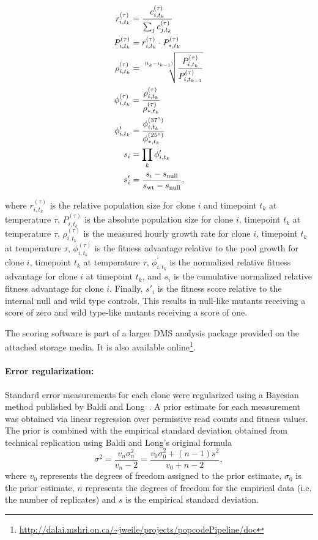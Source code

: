 \begin{align*}
r_{i,t_k}^{(\tau)} &= \frac{ c_{i,t_k}^{(\tau)} }{ \sum_j c_{j,t_k}^{(\tau)} }\\
P_{i,t_k}^{(\tau)} &= r_{i,t_k}^{(\tau)} \cdot P_{*,t_k}^{(\tau)} \\
\rho_{i,t_k}^{(\tau)} &= \sqrt[\uproot{5}(t_k - t_{k-1})]{\frac{P_{i,t_k}^{(\tau)}}{P_{i,t_{k-1}}^{(\tau)}}} \\
\phi_{i,t_k}^{(\tau)} &= \frac{\rho_{i,t_k}^{(\tau)}}{\rho_{*,t_k}^{(\tau)}}\\
\phi_{i,t_k}^\prime &= \frac{\phi_{i,t_k}^{(37^{\circ})}}{\phi_{*,t_k}^{(25^{\circ})}}\\
s_i &= \prod_k \phi_{i,t_k}^\prime \\
s'_i &= \frac{s_i - s_\text{null}}{s_\text{wt} - s_\text{null}},
\end{align*}

where $r_{i,t_k}^{(\tau)}$ is the relative population size for clone $i$ and timepoint $t_k$ at temperature $\tau$, $P_{i,t_k}^{(\tau)}$ is the absolute population size for clone $i$, timepoint $t_k$ at temperature $\tau$, $\rho_{i,t_k}^{(\tau)}$ is the measured hourly growth rate for clone $i$, timepoint $t_k$ at temperature $\tau$, $\phi_{i,t_k}^{(\tau)}$ is the fitness advantage relative to the pool growth for clone $i$, timepoint $t_k$ at temperature $\tau$, $\phi_{i,t_k}^\prime$ is the normalized relative fitness advantage for clone $i$ at timepoint $t_k$, and $s_i$ is the cumulative normalized relative fitness advantage for clone $i$. Finally, $s'_i$ is the fitness score relative to the internal null and wild type controls. This results in null-like mutants receiving a score of zero and wild type-like mutants receiving a score of one.

The scoring software is part of a larger DMS analysis package provided on the attached storage media. It is also available online\footnote{\url{http://dalai.mshri.on.ca/~jweile/projects/popcodePipeline/doc}}.

\paragraph{Error regularization: } Standard error measurements for each clone were regularized using a Bayesian method published by Baldi and Long~\cite{baldi_bayesian_2001}. A prior estimate for each measurement was obtained via linear regression over permissive read counts and fitness values. The prior is combined with the empirical standard deviation obtained from technical replication using Baldi and Long's original formula $$\sigma^2 = \frac{v_n \sigma_n^2}{v_n - 2} = \frac{v_0 \sigma_0^2 + (n-1)s^2}{v_0 + n - 2},$$ where $v_0$ represents the degrees of freedom assigned to the prior estimate, $\sigma_0$ is the prior estimate, $n$ represents the degrees of freedom for the empirical data (i.e. the number of replicates) and $s$ is the empirical standard deviation.

